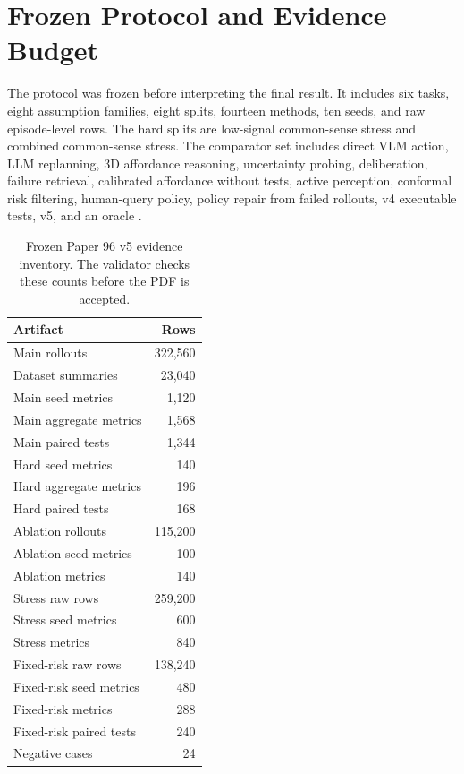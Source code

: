 \documentclass{article}
\begin{document}
\section{Frozen Protocol and Evidence Budget}
The protocol was frozen before interpreting the final result. It includes six tasks, eight assumption families, eight splits, fourteen methods, ten seeds, and raw episode-level rows. The hard splits are low-signal common-sense stress and combined common-sense stress. The comparator set includes direct VLM action, LLM replanning, 3D affordance reasoning, uncertainty probing, deliberation, failure retrieval, calibrated affordance without tests, active perception, conformal risk filtering, human-query policy, policy repair from failed rollouts, v4 executable tests, v5, and an oracle \citep{r101037rev0000027,r101142s0219843625400146,roboticsandthecommonsenseinformaticsituati,r101142s2705078524500024,r101126sciroboticsadn4008,r101109icra4094520209196783,r101093ptjpzy011,r101109cvpr52734202500165,r101093ptjpzy148,r104324978100352313019}.


\begin{table}[t]
\centering
\scriptsize
\begin{tabular}{lr}
\toprule
Artifact & Rows \\
\midrule
Main rollouts & 322,560 \\
Dataset summaries & 23,040 \\
Main seed metrics & 1,120 \\
Main aggregate metrics & 1,568 \\
Main paired tests & 1,344 \\
Hard seed metrics & 140 \\
Hard aggregate metrics & 196 \\
Hard paired tests & 168 \\
Ablation rollouts & 115,200 \\
Ablation seed metrics & 100 \\
Ablation metrics & 140 \\
Stress raw rows & 259,200 \\
Stress seed metrics & 600 \\
Stress metrics & 840 \\
Fixed-risk raw rows & 138,240 \\
Fixed-risk seed metrics & 480 \\
Fixed-risk metrics & 288 \\
Fixed-risk paired tests & 240 \\
Negative cases & 24 \\
\bottomrule
\end{tabular}
\caption{Frozen Paper 96 v5 evidence inventory. The validator checks these counts before the PDF is accepted.}
\label{tab:inventory}
\end{table}
\end{document}
